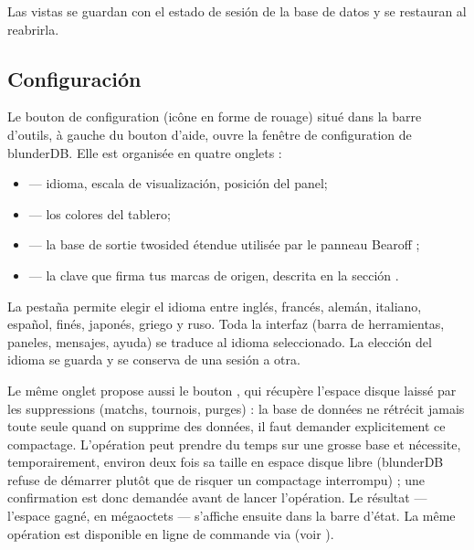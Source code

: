\documentclass[letterpaper,10pt,spanish]{sphinxmanual}
\begin{document}
\sphinxAtStartPar
Las vistas se guardan con el estado de sesión de la base de datos y se restauran al reabrirla.


\subsection{Configuración}
\label{\detokenize{manuel:configuration}}\label{\detokenize{manuel:id2}}
\sphinxAtStartPar
Le bouton de configuration (icône en forme de rouage) situé dans la barre
d’outils, à gauche du bouton d’aide, ouvre la fenêtre de configuration de
blunderDB. Elle est organisée en quatre onglets :
\begin{itemize}
\item {} 
\sphinxAtStartPar
{} — idioma, escala de visualización, posición del panel;

\item {} 
\sphinxAtStartPar
{} — los colores del tablero;

\item {} 
\sphinxAtStartPar
{} — la base de sortie two\sphinxhyphen{}sided étendue utilisée par le panneau
Bearoff ;

\item {} 
\sphinxAtStartPar
{} — la clave que firma tus marcas de origen, descrita en la sección {\hyperref[\detokenize{manuel:diffusion-controlee}]{}}.

\end{itemize}

\sphinxAtStartPar
La pestaña  permite elegir el idioma entre inglés, francés, alemán, italiano, español, finés, japonés, griego y ruso. Toda la interfaz (barra de herramientas, paneles, mensajes, ayuda) se traduce al idioma seleccionado. La elección del idioma se guarda y se conserva de una sesión a otra.

\sphinxAtStartPar
Le même onglet propose aussi le bouton , qui récupère
l’espace disque laissé par les suppressions (matchs, tournois, purges) : la
base de données ne rétrécit jamais toute seule quand on supprime des données,
il faut demander explicitement ce compactage. L’opération peut prendre du
temps sur une grosse base et nécessite, temporairement, environ deux fois sa
taille en espace disque libre (blunderDB refuse de démarrer plutôt que de
risquer un compactage interrompu) ; une confirmation est donc demandée avant
de lancer l’opération. Le résultat — l’espace gagné, en mégaoctets — s’affiche
ensuite dans la barre d’état. La même opération est disponible en ligne de
commande via  (voir {\hyperref[\detokenize{cli:cli}]{}}).
\end{document}
